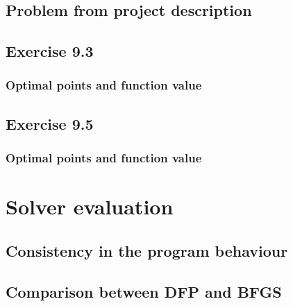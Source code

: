 \documentclass{article}
\begin{document}
\subsection{Problem from project description}

\subsection{Exercise 9.3}

\subsubsection{Optimal points and function value}
\subsection{Exercise 9.5}

\subsubsection{Optimal points and function value}


\section{Solver evaluation}
\subsection{Consistency in the program behaviour}
\subsection{Comparison between DFP and BFGS}





%
%
%
%
%
%
%
\end{document}
